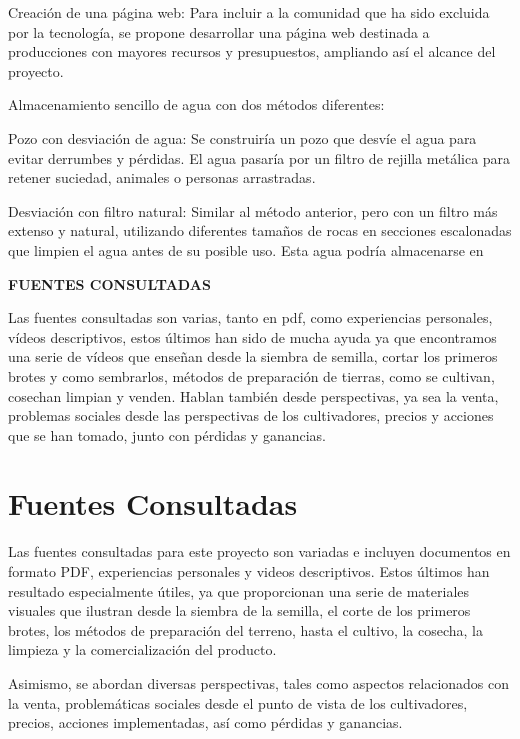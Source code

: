 \documentclass[12pt]{article}
\begin{document}
{{{{{{{{{{		Creación de una página web:
		Para incluir a la comunidad que ha sido excluida por la tecnología, se propone desarrollar una página web destinada a producciones con mayores recursos y presupuestos, ampliando así el alcance del proyecto.
		
		Almacenamiento sencillo de agua con dos métodos diferentes:
		
		Pozo con desviación de agua:
		Se construiría un pozo que desvíe el agua para evitar derrumbes y pérdidas. El agua pasaría por un filtro de rejilla metálica para retener suciedad, animales o personas arrastradas.
		
		Desviación con filtro natural:
		Similar al método anterior, pero con un filtro más extenso y natural, utilizando diferentes tamaños de rocas en secciones escalonadas que limpien el agua antes de su posible uso. Esta agua podría almacenarse en
		
		
		
		
	
	\newpage
	\begin{center}
		{\huge \textbf{FUENTES CONSULTADAS}}
	\end{center}
	\vspace{1cm} 
	{\large %
		Las fuentes consultadas son varias, tanto en pdf, como experiencias personales, vídeos descriptivos, estos últimos han sido de mucha ayuda ya que encontramos una serie de vídeos que enseñan desde la siembra de semilla, cortar los primeros brotes y como sembrarlos, métodos de preparación de tierras, como se cultivan, cosechan limpian y venden.
		Hablan también desde perspectivas, ya sea la venta, problemas sociales desde las perspectivas de los cultivadores, precios y acciones que se han tomado, junto con pérdidas y ganancias. 
	\section*{Fuentes Consultadas}
	
Las fuentes consultadas para este proyecto son variadas e incluyen documentos en formato PDF, experiencias personales y videos descriptivos. Estos últimos han resultado especialmente útiles, ya que proporcionan una serie de materiales visuales que ilustran desde la siembra de la semilla, el corte de los primeros brotes, los métodos de preparación del terreno, hasta el cultivo, la cosecha, la limpieza y la comercialización del producto.

Asimismo, se abordan diversas perspectivas, tales como aspectos relacionados con la venta, problemáticas sociales desde el punto de vista de los cultivadores, precios, acciones implementadas, así como pérdidas y ganancias.
	
}}}}}}}}}}}
\end{document}
